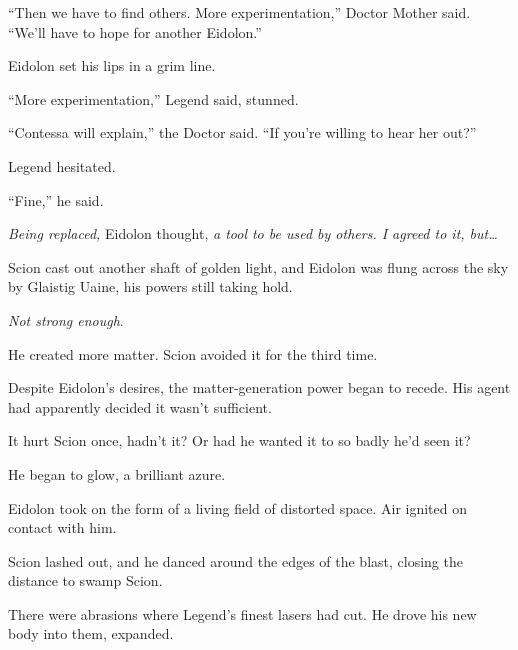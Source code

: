 ``Then we have to find others.  More experimentation,'' Doctor Mother said.  ``We'll have to hope for another Eidolon.''



Eidolon set his lips in a grim line.



``More experimentation,'' Legend said, stunned.



``Contessa will explain,'' the Doctor said.  ``If you're willing to hear her out?''



Legend hesitated.



``Fine,'' he said.



\emph{Being replaced,} Eidolon thought, \emph{a tool to be used by others.  I agreed to it, but\ldots}



\sectionbreak



Scion cast out another shaft of golden light, and Eidolon was flung across the sky by Glaistig Uaine, his powers still taking hold.



\emph{Not strong enough}.



He created more matter.  Scion avoided it for the third time.



Despite Eidolon's desires, the matter-generation power began to recede.  His agent had apparently decided it wasn't sufficient.



It hurt Scion once, hadn't it?  Or had he wanted it to so badly he'd seen it?



He began to glow, a brilliant azure.



Eidolon took on the form of a living field of distorted space.  Air ignited on contact with him.



Scion lashed out, and he danced around the edges of the blast, closing the distance to swamp Scion.



There were abrasions where Legend's finest lasers had cut.  He drove his new body into them, expanded.



